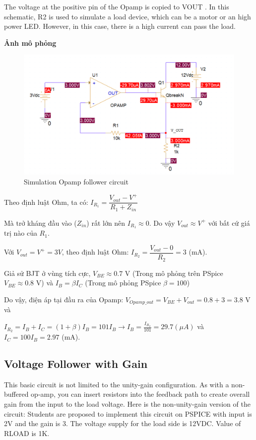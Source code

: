 The voltage at the positive pin of the Opamp is copied to VOUT . In this schematic, R2 is
used to simulate a load device, which can be a motor or an high power LED. However, in
this case, there is a high current can pass the load.

\textbf{Ảnh mô phỏng}

\begin{figure}[ht]
    \centering
    \includegraphics[width=1\textwidth]{graphics/ex1/f5.png}
    \caption{Simulation Opamp follower circuit}
\end{figure}
\pagebreak

Theo định luật Ohm, ta có: $I_{R_1} = \dfrac{V_{out} - V^+}{R_1 + Z_{in}}$

Mà trở kháng đầu vào ($Z_{in}$) rất lớn nên $I_{R_1} \approx 0$. Do vậy $V_{out} \approx V^+$ với bất cứ giá trị nào của $R_1$.

Với $V_{out} = V^+ = 3 V$, theo định luật Ohm: $I_{R_2} = \dfrac{V_{out}-0}{R_2} = 3 $ (mA).

Giả sử BJT ở vùng tích cực, $V_{BE} \approx 0.7$ V (Trong mô phỏng trên PSpice $V_{BE} \approx 0.8$ V) và $I_B = \beta I_C$ (Trong mô phỏng PSpice $\beta = 100$)

Do vậy, điện áp tại đầu ra của Opamp: $V_{Opamp\_out} = V_{BE} + V_{out} = 0.8 + 3 = 3.8 $ V và

$I_{R_2} = I_B + I_C = (1 + \beta)I_B = 101I_B \rightarrow I_B = \frac{I_{R_2}}{101} = 29.7(\mu A)$ và $I_C = 100I_B = 2.97$ (mA).
\pagebreak
\subsection{Voltage Follower with Gain}
This basic circuit is not limited to the unity-gain configuration. As with a non-buffered
op-amp, you can insert resistors into the feedback path to create overall gain from the
input to the load voltage. Here is the non-unity-gain version of the circuit:
Students are proposed to implement this circuit on PSPICE with input is 2V and the gain
is 3. The voltage supply for the load side is 12VDC. Value of RLOAD is 1K.

